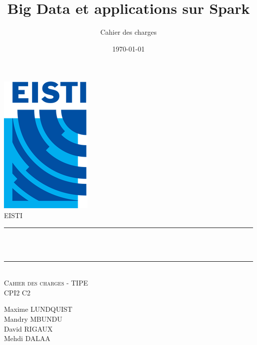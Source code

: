 \documentclass[12pt]{article}
\title{Big Data et applications sur Spark}								%
\author{Cahier des charges}								%
\date{\today}											%
\makeatletter
\let\thetitle\@title
\let\thedate\@date
\makeatother
\begin{document}

\begin{titlepage}
	\centering
    \vspace*{0.5 cm}
    \includegraphics[scale = 0.75 ]{logo1.png}\\[1.0 cm]	%
    \textsc{\LARGE EISTI}\\[2.0 cm]			%
    \rule{\linewidth}{0.2 mm} \\[0.5 cm]
    { \huge \bfseries \thetitle}\\
    \rule{\linewidth}{0.2 mm} \\[1.5 cm]
	\textsc{\Large Cahier des charges - TIPE}\\[0.5 cm]	%
	\textsc{\large CPI2 C2}\\[0.5 cm]		%
	
	\begin{minipage}{0.4\textwidth}
	\centering
		\begin{center} \large
		Maxime LUNDQUIST \\
		Mandry MBUNDU \\
		David RIGAUX \\
		Mehdi DALAA \\
			\end{center}
			\end{minipage}~
			\begin{minipage}{0.4\textwidth}
	\end{minipage}\\[0.8 cm]
	{\large \thedate}\\[1 cm]
	\vfill
	
\end{titlepage}

\end{document}
